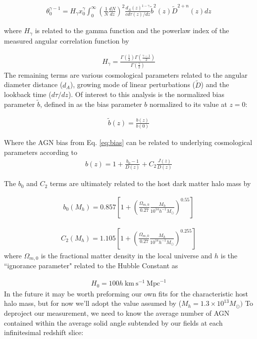 \documentclass[preprint]{aastex63}
\begin{document}
    \begin{align}
        \theta_0^{\gamma-1} = H_\gamma x_0^\gamma \int_0^{\infty}\left(\frac{1}{N} \frac{dN}{dz} \right)^2
        \frac{d_A(z)^{1-\gamma}}{cd\tau(z)/dz} \tilde b^{2} (z) \tilde D^{2+n}(z) dz
    \end{align}
    
    where $H_\gamma$ is related to the gamma function and the powerlaw index of the measured angular correlation function by
    
    \begin{align}
        H_\gamma = \frac{\Gamma\left( \frac{1}{2} \right)\Gamma \left( \frac{\gamma - 1}{2} \right)}{\Gamma \left(\frac{\gamma}{2}\right)}
    \end{align} 
    The remaining terms are various cosmological parameters related to the angular diameter distance ($d_A$), growing mode of linear perturbations ($\tilde D$) and the lookback time ($ d\tau / dz$).
    Of interest to this analysis is the normalized bias parameter $\tilde b$, defined in \cite{koutoulidis} as the bias parameter $b$ normalized
    to its value at $z = 0$:
    
    \begin{align}
        \tilde b(z) = \frac{b(z)}{b(0) }
    \end{align}
    
    Where the AGN bias from Eq. \ref{eq:bias} can be related to underlying cosmological parameters according to 
    \begin{align}
        b(z) = 1 + \frac{b_0 - 1}{D(z)} + C_2 \frac{J(z)}{D(z)}
    \end{align}
    
    The $b_0$ and $C_2$ terms are ultimately related to the host dark matter halo mass by
    
    \begin{align}
        b_0(M_h) = 0.857\left[1+ \left(\frac{\Omega_{m,0}}{0.27} \frac{M_h}{10^{14}h^{-1}M_{\odot}}\right)^{0.55}\right]
    \end{align}
    
    \begin{align}
        C_2(M_h) = 1.105\left[1+ \left(\frac{\Omega_{m,0}}{0.27} \frac{M_h}{10^{14}h^{-1}M_{\odot}}\right)^{0.255}\right]
    \end{align}
    where $\Omega_{m,0}$ is the fractional matter density in the local universe and $h$ is the ``ignorance parameter" \cite{hogg} related to the Hubble Constant as 
    
    \begin{align}
        H_0 = 100h \ \text{km} \ \text{s}^{-1} \  \text{Mpc}^{-1}
    \end{align}
    In the future it may be worth preforming our own fits for the characteristic host halo mass, but for now we'll adopt the value assumed by \citet{koutoulidis} ($M_h = 1.3 \times 10^{13} M_{\odot})$
    To deproject our measurement, we need to know the average number of AGN contained within the average solid angle subtended 
    by our fields at each infinitesimal redshift slice:
    
\end{document}
